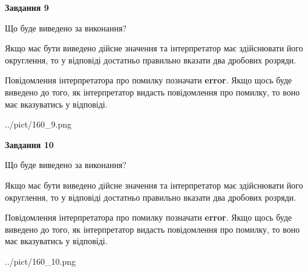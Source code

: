 \documentclass[12pt, ukrainian]{article}
\begin{document}
{\begin {Large}
{\begin {center}\textbf{Завдання 9}\end {center}}\par
Що буде виведено за виконання? \par

Якщо має бути виведено дійсне значення та інтерпретатор має здійснювати його округлення, 
то у відповіді достатньо правильно вказати два дробових розряди.

Повідомлення інтерпретатора про помилку позначати \textbf{error}.
Якщо щось буде виведено до того, як інтерпретатор видасть повідомлення про помилку, 
то воно має вказуватись у відповіді. \par

\begin{center}
	{../pict/160_9.png}
\end{center}
\newpage

{\begin {center}\textbf{Завдання 10}\end {center}}\par
Що буде виведено за виконання? \par

Якщо має бути виведено дійсне значення та інтерпретатор має здійснювати його округлення, 
то у відповіді достатньо правильно вказати два дробових розряди.

Повідомлення інтерпретатора про помилку позначати \textbf{error}.
Якщо щось буде виведено до того, як інтерпретатор видасть повідомлення про помилку, 
то воно має вказуватись у відповіді. \par

\begin{center}
	{../pict/160_10.png}
\end{center}
\newpage

\end {Large}}
\end{document}
